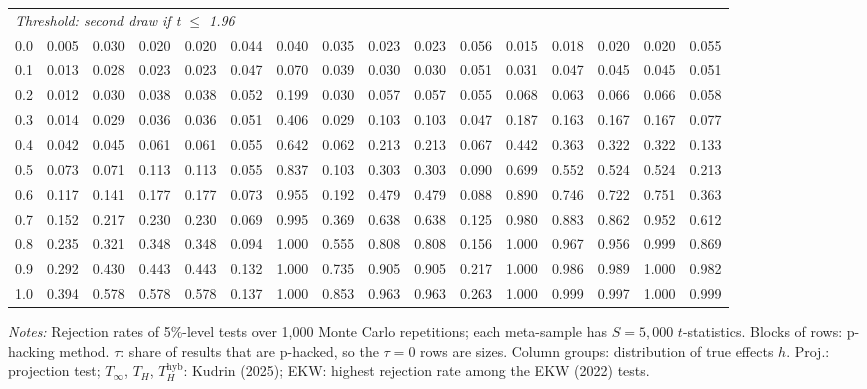 \begin{table}[htbp]
\begin{tabular}{lccccccccccccccc}
\midrule
\multicolumn{16}{l}{\textit{Threshold: second draw if t $\le$ 1.96}} \\
0.0 & 0.005 & 0.030 & 0.020 & 0.020 & 0.044 & 0.040 & 0.035 & 0.023 & 0.023 & 0.056 & 0.015 & 0.018 & 0.020 & 0.020 & 0.055 \\
0.1 & 0.013 & 0.028 & 0.023 & 0.023 & 0.047 & 0.070 & 0.039 & 0.030 & 0.030 & 0.051 & 0.031 & 0.047 & 0.045 & 0.045 & 0.051 \\
0.2 & 0.012 & 0.030 & 0.038 & 0.038 & 0.052 & 0.199 & 0.030 & 0.057 & 0.057 & 0.055 & 0.068 & 0.063 & 0.066 & 0.066 & 0.058 \\
0.3 & 0.014 & 0.029 & 0.036 & 0.036 & 0.051 & 0.406 & 0.029 & 0.103 & 0.103 & 0.047 & 0.187 & 0.163 & 0.167 & 0.167 & 0.077 \\
0.4 & 0.042 & 0.045 & 0.061 & 0.061 & 0.055 & 0.642 & 0.062 & 0.213 & 0.213 & 0.067 & 0.442 & 0.363 & 0.322 & 0.322 & 0.133 \\
0.5 & 0.073 & 0.071 & 0.113 & 0.113 & 0.055 & 0.837 & 0.103 & 0.303 & 0.303 & 0.090 & 0.699 & 0.552 & 0.524 & 0.524 & 0.213 \\
0.6 & 0.117 & 0.141 & 0.177 & 0.177 & 0.073 & 0.955 & 0.192 & 0.479 & 0.479 & 0.088 & 0.890 & 0.746 & 0.722 & 0.751 & 0.363 \\
0.7 & 0.152 & 0.217 & 0.230 & 0.230 & 0.069 & 0.995 & 0.369 & 0.638 & 0.638 & 0.125 & 0.980 & 0.883 & 0.862 & 0.952 & 0.612 \\
0.8 & 0.235 & 0.321 & 0.348 & 0.348 & 0.094 & 1.000 & 0.555 & 0.808 & 0.808 & 0.156 & 1.000 & 0.967 & 0.956 & 0.999 & 0.869 \\
0.9 & 0.292 & 0.430 & 0.443 & 0.443 & 0.132 & 1.000 & 0.735 & 0.905 & 0.905 & 0.217 & 1.000 & 0.986 & 0.989 & 1.000 & 0.982 \\
1.0 & 0.394 & 0.578 & 0.578 & 0.578 & 0.137 & 1.000 & 0.853 & 0.963 & 0.963 & 0.263 & 1.000 & 0.999 & 0.997 & 1.000 & 0.999 \\
\bottomrule
\end{tabular}
\par\smallskip
\begin{minipage}{\linewidth}\footnotesize\textit{Notes:} Rejection rates of 5\%-level tests over 1,000 Monte Carlo repetitions; each meta-sample has $S = 5{,}000$ $t$-statistics. Blocks of rows: p-hacking method. $\tau$: share of results that are p-hacked, so the $\tau = 0$ rows are sizes. Column groups: distribution of true effects $h$. Proj.: projection test; $T_\infty$, $T_H$, $T_H^{\mathrm{hyb}}$: Kudrin (2025); EKW: highest rejection rate among the EKW (2022) tests.\end{minipage}
\end{table}
